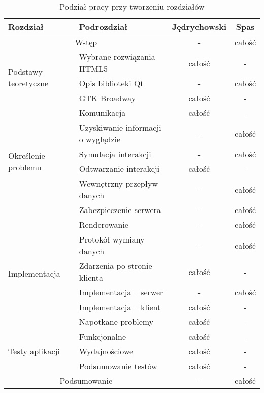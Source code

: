 \begin{table}[H]
\centering  
\begin{tabular}{ |l|l|c|c|}
\hline
Rozdział & Podrozdział              & Jędrychowski & Spas   \\
\hline
\multicolumn{2}{|c|}{Wstęp} & - & całość \\
\hline 
\multirow{3}{*}{Podstawy teoretyczne} & Wybrane rozwiązania HTML5 & całość & -  \\
 & Opis biblioteki Qt & - & całość  \\
 & GTK Broadway & całość & -  \\
 \hline
 \multirow{6}{*}{Określenie problemu} & Komunikacja & całość & -  \\
  & Uzyskiwanie informacji o wyglądzie & - & całość  \\
  & Symulacja interakcji & - & całość  \\
  & Odtwarzanie interakcji& całość & -  \\
  & Wewnętrzny przepływ danych & - & całość  \\
  & Zabezpieczenie serwera & - & całość  \\
  \hline
  \multirow{6}{*}{Implementacja} & Renderowanie & - & całość  \\
   & Protokół wymiany danych & - & całość  \\
   & Zdarzenia po stronie klienta & całość & -  \\
   & Implementacja -- serwer & - & całość  \\
   & Implementacja -- klient & całość & -  \\
   & Napotkane problemy & całość & -  \\
   \hline
   \multirow{3}{*}{Testy aplikacji} & Funkcjonalne & całość & -  \\
     & Wydajnościowe & całość & -  \\
     & Podsumowanie testów & całość & -  \\
   \hline
   \multicolumn{2}{|c|}{Podsumowanie} & - & całość \\
   \hline

\end{tabular}
\caption{Podział pracy przy tworzeniu rozdziałów}
\label{tab:podzial}
\end{table}